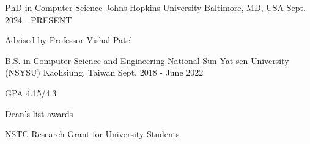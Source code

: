 

\begin{cventries}

  \cventry
    {PhD in Computer Science} %
    {Johns Hopkins University} %
    {Baltimore, MD, USA} %
    {Sept. 2024 - PRESENT} %
    {
      \begin{cvitems} %
        \item Advised by Professor Vishal Patel
      \end{cvitems}
    }

  \cventry
    {B.S. in Computer Science and Engineering} %
    {National Sun Yat-sen University (NSYSU)} %
    {Kaohsiung, Taiwan} %
    {Sept. 2018 - June 2022} %
    {
      \begin{cvitems} %
        \item {GPA 4.15/4.3}
        \item {Dean's list awards}
        \item {NSTC Research Grant for University Students}
      \end{cvitems}
    }

\end{cventries}
